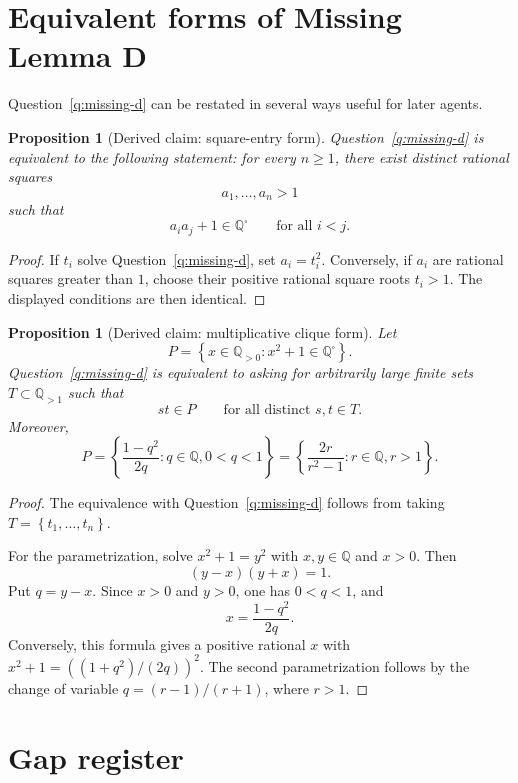 \documentclass[11pt]{article}
\newtheorem{proposition}[theorem]{Proposition}
\theoremstyle{definition}
\theoremstyle{remark}
\newcommand{\Q}{\mathbb{Q}}
\newcommand{\Qs}{\Q^{\square}}
\newcommand{\set}[1]{\left\{#1\right\}}
\begin{document}
\section{Equivalent forms of Missing Lemma D}

Question~\ref{q:missing-d} can be restated in several ways useful for later
agents.

\begin{proposition}[Derived claim: square-entry form]
Question~\ref{q:missing-d} is equivalent to the following statement: for every
\(n\ge 1\), there exist distinct rational squares
\[
a_1,
\ldots,a_n>1
\]
such that
\[
a_i a_j+1\in\Qs
\qquad
\text{for all }i<j.
\]
\end{proposition}

\begin{proof}
If \(t_i\) solve Question~\ref{q:missing-d}, set \(a_i=t_i^2\).  Conversely, if
\(a_i\) are rational squares greater than \(1\), choose their positive rational
square roots \(t_i>1\).  The displayed conditions are then identical.
\end{proof}

\begin{proposition}[Derived claim: multiplicative clique form]
Let
\[
P=\set{x\in\Q_{>0}:x^2+1\in\Qs}.
\]
Question~\ref{q:missing-d} is equivalent to asking for arbitrarily large finite
sets \(T\subset\Q_{>1}\) such that
\[
st\in P
\qquad
\text{for all distinct }s,t\in T.
\]
Moreover,
\[
P=\set{\frac{1-q^2}{2q}:q\in\Q,
0<q<1}
=\set{\frac{2r}{r^2-1}:r\in\Q,
r>1}.
\]
\end{proposition}

\begin{proof}
The equivalence with Question~\ref{q:missing-d} follows from taking
\(T=\set{t_1,
\ldots,t_n}\).

For the parametrization, solve \(x^2+1=y^2\) with \(x,y\in\Q\) and \(x>0\).
Then
\[
(y-x)(y+x)=1.
\]
Put \(q=y-x\).  Since \(x>0\) and \(y>0\), one has \(0<q<1\), and
\[
x=\frac{1-q^2}{2q}.
\]
Conversely, this formula gives a positive rational \(x\) with
\(x^2+1={((1+q^2)/(2q))}^2\).  The second parametrization follows by the change
of variable \(q=(r-1)/(r+1)\), where \(r>1\).
\end{proof}

\section{Gap register}
\end{document}
